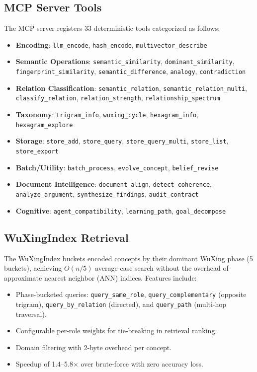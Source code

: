 \documentclass[11pt,a4paper]{article}
\begin{document}
\subsection{MCP Server Tools}

The MCP server registers 33 deterministic tools categorized as follows:

\begin{itemize}[nosep]
\item \textbf{Encoding}: \texttt{llm\_encode}, \texttt{hash\_encode},
  \texttt{multivector\_describe}
\item \textbf{Semantic Operations}: \texttt{semantic\_similarity},
  \texttt{dominant\_similarity}, \texttt{fingerprint\_similarity},
  \texttt{semantic\_difference}, \texttt{analogy}, \texttt{contradiction}
\item \textbf{Relation Classification}: \texttt{semantic\_relation},
  \texttt{semantic\_relation\_multi}, \texttt{classify\_relation},
  \texttt{relation\_strength}, \texttt{relationship\_spectrum}
\item \textbf{Taxonomy}: \texttt{trigram\_info}, \texttt{wuxing\_cycle},
  \texttt{hexagram\_info}, \texttt{hexagram\_explore}
\item \textbf{Storage}: \texttt{store\_add}, \texttt{store\_query},
  \texttt{store\_query\_multi}, \texttt{store\_list}, \texttt{store\_export}
\item \textbf{Batch/Utility}: \texttt{batch\_process},
  \texttt{evolve\_concept}, \texttt{belief\_revise}
\item \textbf{Document Intelligence}: \texttt{document\_align},
  \texttt{detect\_coherence}, \texttt{analyze\_argument},
  \texttt{synthesize\_findings}, \texttt{audit\_contract}
\item \textbf{Cognitive}: \texttt{agent\_compatibility},
  \texttt{learning\_path}, \texttt{goal\_decompose}
\end{itemize}

\subsection{WuXingIndex Retrieval}

The WuXingIndex buckets encoded concepts by their dominant WuXing phase (5
buckets), achieving $O(n/5)$ average-case search without the overhead of
approximate nearest neighbor (ANN) indices. Features include:

\begin{itemize}[nosep]
\item Phase-bucketed queries: \texttt{query\_same\_role},
  \texttt{query\_complementary} (opposite trigram), \texttt{query\_by\_relation}
  (directed), and \texttt{query\_path} (multi-hop traversal).
\item Configurable per-role weights for tie-breaking in retrieval ranking.
\item Domain filtering with 2-byte overhead per concept.
\item Speedup of 1.4--5.8$\times$ over brute-force with zero accuracy loss.
\end{itemize}
\end{document}
